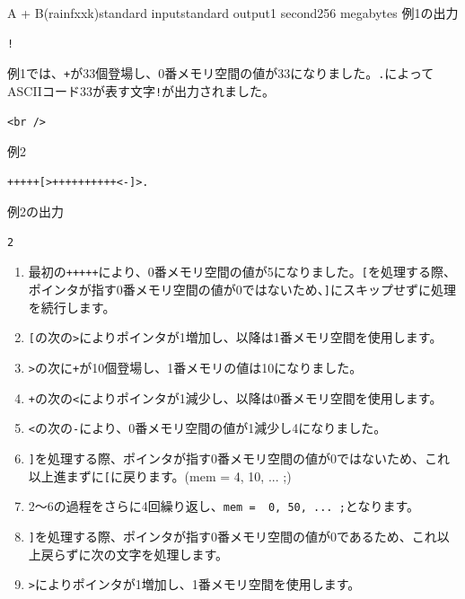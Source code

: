 \begin{problem}{A + B(rainfxxk)}{standard input}{standard output}{1 second}{256 megabytes}
例1の出力

\begin{lstlisting}
!
\end{lstlisting}

例1では、\texttt{+}が33個登場し、0番メモリ空間の値が33になりました。\texttt{.}によってASCIIコード33が表す文字\texttt{!}が出力されました。

\begin{lstlisting}
<br />
\end{lstlisting}

例2

\begin{lstlisting}
+++++[>++++++++++<-]>.
\end{lstlisting}

例2の出力

\begin{lstlisting}
2
\end{lstlisting}
\begin{enumerate}
\item 
最初の\texttt{+++++}により、0番メモリ空間の値が5になりました。\texttt{[}を処理する際、ポインタが指す0番メモリ空間の値が0ではないため、\texttt{]}にスキップせずに処理を続行します。


\item 
\texttt{[}の次の\texttt{>}によりポインタが1増加し、以降は1番メモリ空間を使用します。


\item 
\texttt{>}の次に\texttt{+}が10個登場し、1番メモリの値は10になりました。


\item 
\texttt{+}の次の\texttt{<}によりポインタが1減少し、以降は0番メモリ空間を使用します。


\item 
\texttt{<}の次の\texttt{-}により、0番メモリ空間の値が1減少し4になりました。


\item 
\texttt{]}を処理する際、ポインタが指す0番メモリ空間の値が0ではないため、これ以上進まずに\texttt{[}に戻ります。(mem = { 4, 10, ... };)


\item 
2〜6の過程をさらに4回繰り返し、\texttt{mem = { 0, 50, ... };}となります。


\item 
\texttt{]}を処理する際、ポインタが指す0番メモリ空間の値が0であるため、これ以上戻らずに次の文字を処理します。


\item 
\texttt{>}によりポインタが1増加し、1番メモリ空間を使用します。



\end{enumerate}
\end{problem}
